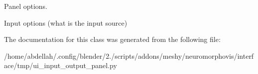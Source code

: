 Panel options. 

Input options (what is the input source) 

The documentation for this class was generated from the following file\+:\begin{DoxyCompactItemize}
\item 
/home/abdellah/.\+config/blender/2./scripts/addons/meshy/neuromorphovis/interface/tmp/ui\+\_\+input\+\_\+output\+\_\+panel.\+py\end{DoxyCompactItemize}
